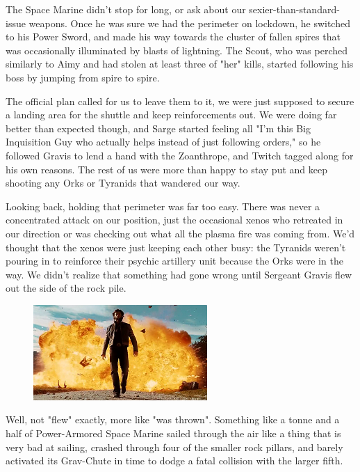 The Space Marine didn't stop for long, or ask about our sexier-than-standard-issue weapons. 
Once he was sure we had the perimeter on lockdown, he switched to his Power Sword, and made his way towards the cluster of fallen spires that was occasionally illuminated by blasts of lightning. 
The Scout, who was perched similarly to Aimy and had stolen at least three of "her" kills, started following his boss by jumping from spire to spire. 


The official plan called for us to leave them to it, we were just supposed to secure a landing area for the shuttle and keep reinforcements out. 
We were doing far better than expected though, and Sarge started feeling all "I'm this Big Inquisition Guy who actually helps instead of just following orders," so he followed Gravis to lend a hand with the Zoanthrope, and Twitch tagged along for his own reasons. 
The rest of us were more than happy to stay put and keep shooting any Orks or Tyranids that wandered our way. 


Looking back, holding that perimeter was far too easy. 
There was never a concentrated attack on our position, just the occasional xenos who retreated in our direction or was checking out what all the plasma fire was coming from. 
We'd thought that the xenos were just keeping each other busy: 
the Tyranids weren't pouring in to reinforce their psychic artillery unit because the Orks were in the way. 
We didn't realize that something had gone wrong until Sergeant Gravis flew out the side of the rock pile.

\begin{figure}
	\begin{center}
		\includegraphics[width=\figwidth]{pics/12/38.png}
	\end{center}
\end{figure}
Well, not "flew" exactly, more like "was thrown". 
Something like a tonne and a half of Power-Armored Space Marine sailed through the air like a thing that is very bad at sailing, crashed through four of the smaller rock pillars, and barely activated its Grav-Chute in time to dodge a fatal collision with the larger fifth.

